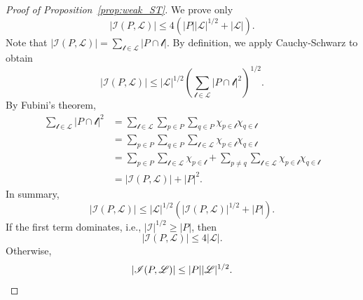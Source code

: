     \begin{proof}[Proof of Proposition~\ref{prop:weak_ST}]
    We prove only
        \begin{equation*}
            |\mathscr{I}(P,\mathscr{L})|\leq 4(|P||\mathscr{L}|^{1/2}+|\mathscr{L}|).
        \end{equation*}
    Note that $|\mathscr{I}(P,\mathscr{L})|=\sum_{\mathscr{l}\in \mathscr{L}}|P\cap \mathscr{l}|$. By definition, we apply Cauchy-Schwarz to obtain
        \begin{equation*}
            |\mathscr{I}(P,\mathscr{L})|\leq |\mathscr{L}|^{1/2}\left( \sum_{\mathscr{l}\in \mathscr{L}}|P\cap \mathscr{l}|^{2} \right)^{1/2}.
        \end{equation*}
    By Fubini's theorem,
    \begin{align*}
        \sum_{\mathscr{l} \in \mathscr{L}}|P \cap \mathscr{l}|^{2} &= \sum_{\mathscr{l}\in \mathscr{L}}\sum_{p \in P}\sum_{q \in P}\chi_{p \in \mathscr{l}}\chi_{q \in \mathscr{l}} \\
        &= \sum_{p \in P}\sum_{q \in P}\sum_{\mathscr{l}\in \mathscr{L}}\chi_{p \in \mathscr{l}}\chi_{q \in \mathscr{l}} \\
        &= \sum_{p \in P}\sum_{\mathscr{l}\in \mathscr{L}} \chi_{p \in \mathscr{l}} + \sum_{p\neq q}\sum_{\mathscr{l}\in \mathscr{L}}\chi_{p \in \mathscr{l}}\chi_{q \in \mathscr{l}} \\
        &= |\mathscr{I}(P,\mathscr{L})| + |P|^{2}.
    \end{align*}
    In summary,
        \begin{equation*}
            |\mathscr{I}(P,\mathscr{L})|\leq |\mathscr{L}|^{1/2}(|\mathscr{I}(P,\mathscr{L})|^{1/2}+|P|).
        \end{equation*}
    If the first term dominates, i.e., $|\mathscr{I}|^{1/2}\geq |P|$, then
        \begin{equation*}
            |\mathscr{I}(P,\mathscr{L})|\leq 4|\mathscr{L}|.
        \end{equation*}
    Otherwise,
        \begin{equation*}
            |\mathscr{I}(P,\mathscr{L})|\leq |P||\mathscr{L}|^{1/2}.\qedhere
        \end{equation*}
    \end{proof}

